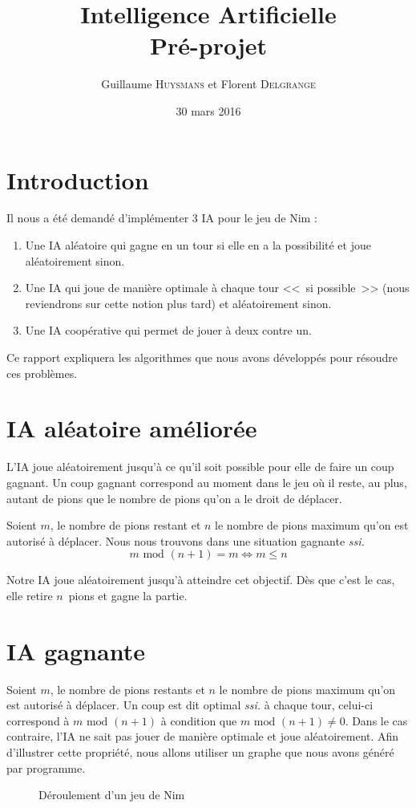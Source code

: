 \documentclass[10pt,a4paper]{article}
\author{Guillaume \textsc{Huysmans} et Florent \textsc{Delgrange}}
\title{Intelligence Artificielle\\Pré-projet}
\date{30 mars 2016}
\newcommand{\ssi}{\textit{ssi. }}
\renewcommand{\mod}{\text{ mod }}
\begin{document}
\maketitle
\section{Introduction}
Il nous a été demandé d'implémenter 3 IA pour le jeu de Nim :
\begin{enumerate}
\item Une IA aléatoire qui gagne en un tour si elle en a la possibilité et joue
	aléatoirement sinon.
\item Une IA qui joue de manière optimale à chaque tour <<~si possible~>>
	(nous reviendrons sur cette notion plus tard) et aléatoirement sinon.
\item Une IA coopérative qui permet de jouer à deux contre un.
\end{enumerate}

Ce rapport expliquera les algorithmes que nous avons développés
pour résoudre ces problèmes.

\section{IA aléatoire améliorée}
L'IA joue aléatoirement jusqu'à ce qu'il soit possible pour elle de faire un
coup gagnant. Un coup gagnant correspond au moment dans le jeu où il reste, au
plus, autant de pions que le nombre de pions qu'on a le droit de déplacer.

Soient $m$, le nombre de pions restant et $n$ le nombre de pions maximum qu'on
est autorisé à déplacer. Nous nous trouvons dans une situation gagnante \ssi
\[m \mod (n+1) = m \Leftrightarrow m \leq n\]

Notre IA joue aléatoirement jusqu'à atteindre cet objectif.
Dès que c'est le cas, elle retire $n$~pions et gagne la partie.

\section{IA gagnante}
Soient $m$, le nombre de pions restants et $n$ le nombre de pions maximum qu'on
est autorisé à déplacer. Un coup est dit optimal \ssi à chaque tour,
celui-ci correspond à $m \mod (n+1)$ à condition que $m \mod (n+1) \neq 0$.
Dans le cas contraire, l'IA ne sait pas jouer de manière optimale et joue
aléatoirement.
Afin d'illustrer cette propriété, nous allons utiliser un
graphe que nous avons généré par programme.
\begin{figure}
\caption{Déroulement d'un jeu de Nim}
\label{nim12}
\end{figure}
\end{document}
